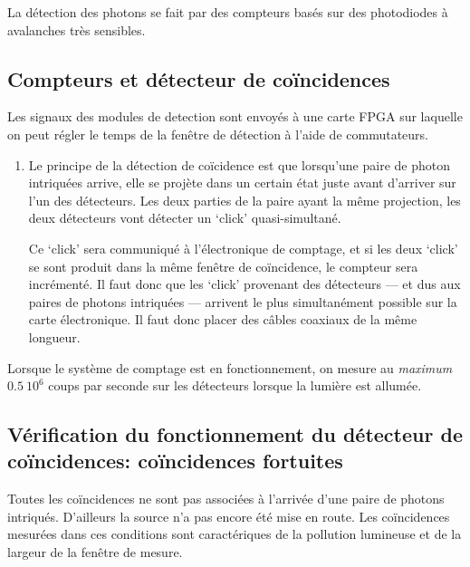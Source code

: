 \documentclass[twocolumn, 10pt]{article}
\begin{document}
\par La détection des photons se fait par des compteurs basés sur des photodiodes à avalanches très sensibles.

\subsection{Compteurs et détecteur de coïncidences}

\par Les signaux des modules de detection sont envoyés à une carte FPGA sur laquelle on peut régler le temps de la fenêtre de détection à l'aide de commutateurs. 

\begin{enumerate}
    \item \par Le principe de la détection de coïcidence est que lorsqu'une paire de photon intriquées arrive, elle se projète dans un certain état juste avant d'arriver sur l'un des détecteurs. Les deux parties de la paire ayant la même projection, les deux détecteurs vont détecter un `click' quasi-simultané.
    \par Ce `click' sera communiqué à l'électronique de comptage, et si les deux `click' se sont produit dans la même fenêtre de coïncidence, le compteur sera incrémenté. Il faut donc que les `click' provenant des détecteurs --- et dus aux paires de photons intriquées --- arrivent le plus simultanément possible sur la carte électronique. Il faut donc placer des câbles coaxiaux de la même longueur.
\end{enumerate}

\par Lorsque le système de comptage est en fonctionnement, on mesure au \textit{maximum} $0.5\ 10^{6}$ coups par seconde sur les détecteurs lorsque la lumière est allumée.

\subsection{Vérification du fonctionnement du détecteur de coïncidences: coïncidences fortuites}

\par Toutes les coïncidences ne sont pas associées à l'arrivée d'une paire de photons intriqués. D'ailleurs la source n'a pas encore été mise en route. Les coïncidences mesurées dans ces conditions sont caractériques de la pollution lumineuse et de la largeur de la fenêtre de mesure.
\end{document}
